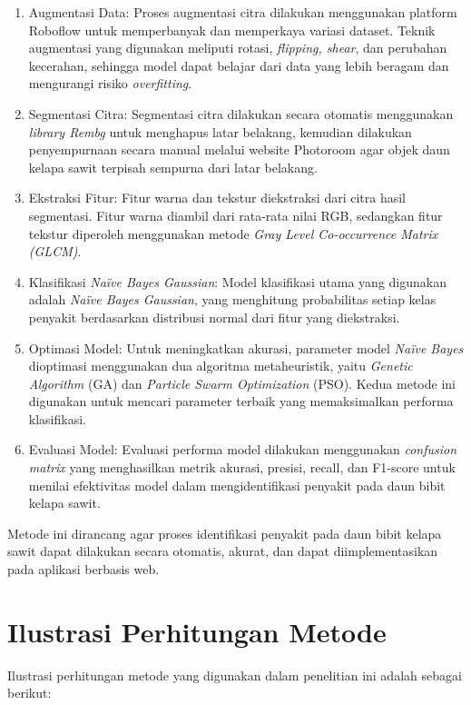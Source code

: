 \begin{enumerate}[noitemsep]
	\item  Augmentasi Data:  Proses augmentasi citra dilakukan menggunakan platform Roboflow untuk memperbanyak dan memperkaya variasi dataset. Teknik augmentasi yang digunakan meliputi rotasi, \textit{flipping, shear}, dan perubahan kecerahan, sehingga model dapat belajar dari data yang lebih beragam dan mengurangi risiko \textit{overfitting}.
	\item  Segmentasi Citra:  Segmentasi citra dilakukan secara otomatis menggunakan \textit{library Rembg} untuk menghapus latar belakang, kemudian dilakukan penyempurnaan secara manual melalui website Photoroom agar objek daun kelapa sawit terpisah sempurna dari latar belakang.
	\item  Ekstraksi Fitur:  Fitur warna dan tekstur diekstraksi dari citra hasil segmentasi. Fitur warna diambil dari rata-rata nilai RGB, sedangkan fitur tekstur diperoleh menggunakan metode \textit{Gray Level Co-occurrence Matrix (GLCM)}.
	\item  Klasifikasi \textit{Naïve Bayes Gaussian}:  Model klasifikasi utama yang digunakan adalah \textit{Naïve Bayes Gaussian}, yang menghitung probabilitas setiap kelas penyakit berdasarkan distribusi normal dari fitur yang diekstraksi.
	\item  Optimasi Model:  Untuk meningkatkan akurasi, parameter model \textit{Naïve Bayes} dioptimasi menggunakan dua algoritma metaheuristik, yaitu \textit{Genetic Algorithm} (GA) dan \textit{Particle Swarm Optimization} (PSO). Kedua metode ini digunakan untuk mencari parameter terbaik yang memaksimalkan performa klasifikasi.
	\item Evaluasi Model:  Evaluasi performa model dilakukan menggunakan \textit{confusion matrix} yang menghasilkan metrik akurasi, presisi, recall, dan F1-score untuk menilai efektivitas model dalam mengidentifikasi penyakit pada daun bibit kelapa sawit.
\end{enumerate}

Metode ini dirancang agar proses identifikasi penyakit pada daun bibit kelapa sawit dapat dilakukan secara otomatis, akurat, dan dapat diimplementasikan pada aplikasi berbasis web.

\section{Ilustrasi Perhitungan Metode} \label{III.Ilustrasi Perhitungan Metode}
Ilustrasi perhitungan metode yang digunakan dalam penelitian ini adalah sebagai berikut:

